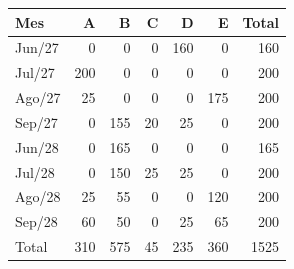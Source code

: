 \begin{tabular}{lr r r r r r}
\toprule
Mes & A & B & C & D & E & Total \\
\midrule
Jun/27 & 0 & 0 & 0 & 160 & 0 & 160 \\
Jul/27 & 200 & 0 & 0 & 0 & 0 & 200 \\
Ago/27 & 25 & 0 & 0 & 0 & 175 & 200 \\
Sep/27 & 0 & 155 & 20 & 25 & 0 & 200 \\
Jun/28 & 0 & 165 & 0 & 0 & 0 & 165 \\
Jul/28 & 0 & 150 & 25 & 25 & 0 & 200 \\
Ago/28 & 25 & 55 & 0 & 0 & 120 & 200 \\
Sep/28 & 60 & 50 & 0 & 25 & 65 & 200 \\
\midrule
Total & 310 & 575 & 45 & 235 & 360 & 1525 \\
\bottomrule
\end{tabular}
